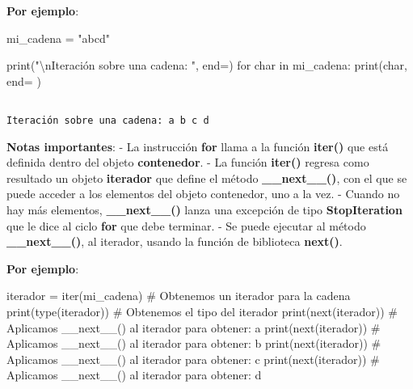 \documentclass[
  letterpaper,
  DIV=11,
  numbers=noendperiod]{scrreprt}
\newenvironment{Shaded}{\begin{snugshade}}{\end{snugshade}}
\newcommand{\BuiltInTok}[1]{\textcolor[rgb]{0.00,0.23,0.31}{#1}}
\newcommand{\CharTok}[1]{\textcolor[rgb]{0.13,0.47,0.30}{#1}}
\newcommand{\CommentTok}[1]{\textcolor[rgb]{0.37,0.37,0.37}{#1}}
\newcommand{\ControlFlowTok}[1]{\textcolor[rgb]{0.00,0.23,0.31}{#1}}
\newcommand{\KeywordTok}[1]{\textcolor[rgb]{0.00,0.23,0.31}{#1}}
\newcommand{\NormalTok}[1]{\textcolor[rgb]{0.00,0.23,0.31}{#1}}
\newcommand{\OperatorTok}[1]{\textcolor[rgb]{0.37,0.37,0.37}{#1}}
\newcommand{\StringTok}[1]{\textcolor[rgb]{0.13,0.47,0.30}{#1}}
\begin{document}
\textbf{Por ejemplo}:

\begin{Shaded}
\begin{Highlighting}[]
\NormalTok{mi\_cadena }\OperatorTok{=} \StringTok{"abcd"}

\BuiltInTok{print}\NormalTok{(}\StringTok{"}\CharTok{\textbackslash{}n}\StringTok{Iteración sobre una cadena: "}\NormalTok{, end}\OperatorTok{=}\StringTok{\textquotesingle{}\textquotesingle{}}\NormalTok{)}
\ControlFlowTok{for}\NormalTok{ char }\KeywordTok{in}\NormalTok{ mi\_cadena:}
    \BuiltInTok{print}\NormalTok{(char, end}\OperatorTok{=}\StringTok{\textquotesingle{} \textquotesingle{}}\NormalTok{)}
\end{Highlighting}
\end{Shaded}

\begin{verbatim}

Iteración sobre una cadena: a b c d 
\end{verbatim}

\textbf{Notas importantes}: - La instrucción \textbf{for} llama a la
función \textbf{iter()} que está definida dentro del objeto
\textbf{contenedor}. - La función \textbf{iter()} regresa como resultado
un objeto \textbf{iterador} que define el método
\textbf{\_\_next\_\_()}, con el que se puede acceder a los elementos del
objeto contenedor, uno a la vez. - Cuando no hay más elementos,
\textbf{\_\_next\_\_()} lanza una excepción de tipo
\textbf{StopIteration} que le dice al ciclo \textbf{for} que debe
terminar. - Se puede ejecutar al método \textbf{\_\_next\_\_()}, al
iterador, usando la función de biblioteca \textbf{next()}.

\textbf{Por ejemplo}:

\begin{Shaded}
\begin{Highlighting}[]
\NormalTok{iterador }\OperatorTok{=} \BuiltInTok{iter}\NormalTok{(mi\_cadena) }\CommentTok{\# Obtenemos un iterador para la cadena}
\BuiltInTok{print}\NormalTok{(}\BuiltInTok{type}\NormalTok{(iterador)) }\CommentTok{\# Obtenemos el tipo del iterador}
\BuiltInTok{print}\NormalTok{(}\BuiltInTok{next}\NormalTok{(iterador)) }\CommentTok{\# Aplicamos \_\_next\_\_()  al iterador para obtener: a}
\BuiltInTok{print}\NormalTok{(}\BuiltInTok{next}\NormalTok{(iterador)) }\CommentTok{\# Aplicamos \_\_next\_\_()  al iterador para obtener: b}
\BuiltInTok{print}\NormalTok{(}\BuiltInTok{next}\NormalTok{(iterador)) }\CommentTok{\# Aplicamos \_\_next\_\_()  al iterador para obtener: c}
\BuiltInTok{print}\NormalTok{(}\BuiltInTok{next}\NormalTok{(iterador)) }\CommentTok{\# Aplicamos \_\_next\_\_()  al iterador para obtener: d}
\end{Highlighting}
\end{Shaded}
\end{document}
